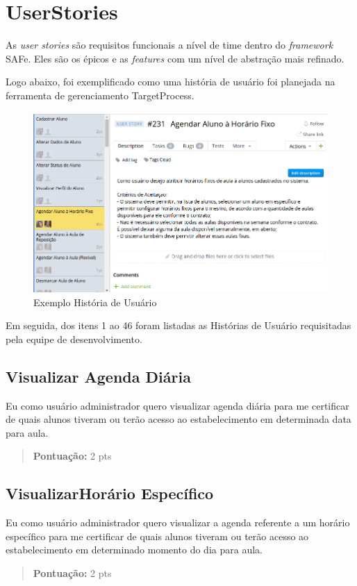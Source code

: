 \section[UserStories]{UserStories}
As \textsl{user stories} são requisitos funcionais a nível de time dentro do
\textsl{framework} SAFe. Eles são os épicos e as \textsl{features} com um nível
de abstração mais refinado.

Logo abaixo, foi exemplificado como uma história de usuário foi planejada na ferramenta de gerenciamento TargetProcess.

\begin{figure}[!htb]
    \centering
    \includegraphics[width=\textwidth]{figuras/exemplo_user_story.png}
    \caption{Exemplo História de Usuário}
    \label{fig:exemplo_user_story}
\end{figure}

Em seguida, dos itens 1 ao 46 foram listadas as Histórias de Usuário requisitadas pela equipe de desenvolvimento.

\subsection[Visualizar Agenda Diária]{Visualizar Agenda Diária}
Eu como usuário administrador quero visualizar agenda diária para
me certificar de quais alunos tiveram ou terão acesso ao estabelecimento
em determinada data para aula.
\begin{quote}
    \textbf{Pontuação:} 2 pts
\end{quote}

\subsection[Visualizar Horário Específico]{VisualizarHorário Específico}
Eu como usuário administrador quero visualizar a agenda referente a um horário
específico para me certificar de quais alunos tiveram ou terão acesso ao
estabelecimento em determinado momento do dia para aula.
\begin{quote}
    \textbf{Pontuação:} 2 pts
\end{quote}

